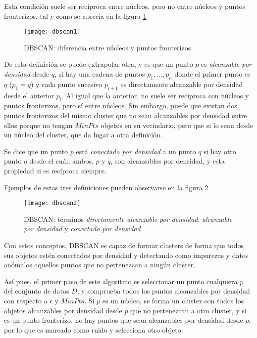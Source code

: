 \documentclass[10pt, a4paper]{article}
\begin{document}
Esta condición suele ser recíproca entre núcleos, pero no entre núcleos y puntos fronterizos, tal y como se aprecia en la figura \ref{fig:dbscan1}

\begin{figure}[ht]
\centering
\texttt{[image: dbscan1]}
\caption{DBSCAN: diferencia entre núcleos y puntos fronterizos \cite{DBSCAN}.}
\label{fig:dbscan1}
\end{figure}

De esta definición se puede extrapolar otra, y es que un punto $p$ es \textit{alcanzable por densidad} desde $q$, si hay una cadena de puntos $p_1, \ldots, p_n$ donde el primer punto es $q$ ($p_1 = q$) y cada punto sucesivo $p_{i+1}$ es directamente alcanzable por densidad desde el anterior $p_i$. Al igual que la anterior, no suele ser recíproca con núcleos y puntos fronterizos, pero sí entre núcleos. Sin embargo, puede que existan dos puntos fronterizos del mismo cluster que no sean alcanzables por densidad entre ellos porque no tengan $MinPts$ objetos en su vecindario, pero que si lo sean desde un núcleo del cluster, que da lugar a otra definición.
 
Se dice que un punto $p$ está \textit{conectado por densidad} a un punto $q$ si hay otro punto $o$ desde el cuál, ambos, $p$ y $q$, son alcanzables por densidad, y esta propiedad si es recíproca siempre.  

Ejemplos de estas tres definiciones pueden observarse en la figura \ref{fig:dbscan2}.

\begin{figure}[ht]
\centering
\texttt{[image: dbscan2]}
\caption{DBSCAN: términos \textit{directamente alcanzable por densidad}, \textit{alcanzable por densidad} y \textit{conectado por densidad} \cite{DBSCAN 2}.}
\label{fig:dbscan2}
\end{figure}

Con estos conceptos, DBSCAN es capaz de formar clusters de forma que todos sus objetos estén conectados por densidad y detectando como impurezas y datos anómalos aquellos puntos que no pertenezcan a ningún cluster.

Así pues, el primer paso de este algoritmo es seleccionar un punto cualquiera $p$ del conjunto de datos $D$, y comprueba todos los puntos alcanzables por densidad con respecto a $\epsilon$ y $MinPts$. Si $p$ es un núcleo, se forma un cluster con todos los objetos alcanzables por densidad desde $p$ que no pertenezcan a otro cluster, y si es un punto fronterizo, no hay puntos que sean alcanzables por densidad desde $p$, por lo que es marcado como ruido y selecciona otro objeto. 
\end{document}
